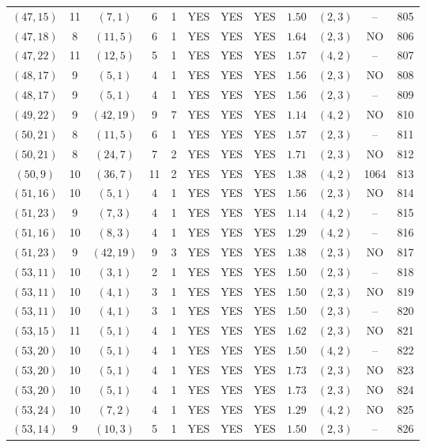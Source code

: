 \begin{longtable}{|c|c|c|c|c|c|c|c|c|c|c|c|}
$(47,15)$ & 11 & $(7,1)$ & 6 & 1 & YES & YES & YES & $1.50$ & $(2,3)$ & -- & 805\\
$(47,18)$ & 8 & $(11,5)$ & 6 & 1 & YES & YES & YES & $1.64$ & $(2,3)$ & NO & 806\\
$(47,22)$ & 11 & $(12,5)$ & 5 & 1 & YES & YES & YES & $1.57$ & $(4,2)$ & -- & 807\\
$(48,17)$ & 9 & $(5,1)$ & 4 & 1 & YES & YES & YES & $1.56$ & $(2,3)$ & NO & 808\\
$(48,17)$ & 9 & $(5,1)$ & 4 & 1 & YES & YES & YES & $1.56$ & $(2,3)$ & -- & 809\\
$(49,22)$ & 9 & $(42,19)$ & 9 & 7 & YES & YES & YES & $1.14$ & $(4,2)$ & NO & 810\\
$(50,21)$ & 8 & $(11,5)$ & 6 & 1 & YES & YES & YES & $1.57$ & $(2,3)$ & -- & 811\\
$(50,21)$ & 8 & $(24,7)$ & 7 & 2 & YES & YES & YES & $1.71$ & $(2,3)$ & NO & 812\\
$(50,9)$ & 10 & $(36,7)$ & 11 & 2 & YES & YES & YES & $1.38$ & $(4,2)$ & 1064 & 813\\
$(51,16)$ & 10 & $(5,1)$ & 4 & 1 & YES & YES & YES & $1.56$ & $(2,3)$ & NO & 814\\
$(51,23)$ & 9 & $(7,3)$ & 4 & 1 & YES & YES & YES & $1.14$ & $(4,2)$ & -- & 815\\
$(51,16)$ & 10 & $(8,3)$ & 4 & 1 & YES & YES & YES & $1.29$ & $(4,2)$ & -- & 816\\
$(51,23)$ & 9 & $(42,19)$ & 9 & 3 & YES & YES & YES & $1.38$ & $(2,3)$ & NO & 817\\
$(53,11)$ & 10 & $(3,1)$ & 2 & 1 & YES & YES & YES & $1.50$ & $(2,3)$ & -- & 818\\
$(53,11)$ & 10 & $(4,1)$ & 3 & 1 & YES & YES & YES & $1.50$ & $(2,3)$ & NO & 819\\
$(53,11)$ & 10 & $(4,1)$ & 3 & 1 & YES & YES & YES & $1.50$ & $(2,3)$ & -- & 820\\
$(53,15)$ & 11 & $(5,1)$ & 4 & 1 & YES & YES & YES & $1.62$ & $(2,3)$ & NO & 821\\
$(53,20)$ & 10 & $(5,1)$ & 4 & 1 & YES & YES & YES & $1.50$ & $(4,2)$ & -- & 822\\
$(53,20)$ & 10 & $(5,1)$ & 4 & 1 & YES & YES & YES & $1.73$ & $(2,3)$ & NO & 823\\
$(53,20)$ & 10 & $(5,1)$ & 4 & 1 & YES & YES & YES & $1.73$ & $(2,3)$ & NO & 824\\
$(53,24)$ & 10 & $(7,2)$ & 4 & 1 & YES & YES & YES & $1.29$ & $(4,2)$ & NO & 825\\
$(53,14)$ & 9 & $(10,3)$ & 5 & 1 & YES & YES & YES & $1.50$ & $(2,3)$ & -- & 826\\

\end{longtable}
